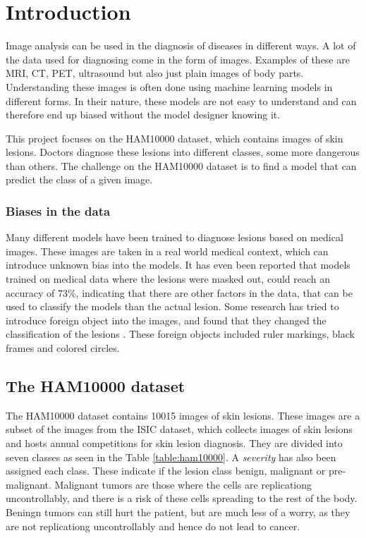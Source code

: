 \chapter{Introduction}\label{sec:introduction}
Image analysis can be used in the diagnosis of diseases in different ways.
A lot of the data used for diagnosing come in the form of images.
Examples of these are MRI, CT, PET, ultrasound but also just plain images of body parts.
Understanding these images is often done using machine learning models in different forms.
In their nature, these models are not easy to understand and can therefore end up biased without
the model designer knowing it.

This project focuses on the HAM10000 dataset\cite{Tschandl_2018}, which contains images of skin lesions.
Doctors diagnose these lesions into different classes, some more dangerous than others.
The challenge on the HAM10000 dataset is to find a model that can predict the class of a given image.

\subsection{Biases in the data}
Many different models have been trained to diagnose lesions based on medical images.
These images are taken in a real world medical context, which can introduce unknown bias into the models.
It has even been reported that models trained on medical data where the lesions were masked out,
could reach an accuracy of $73\%$\cite{DeConstructing_Bias_on_Skin_Lesion_Datasets_2019}, indicating that there are other factors in the data, 
that can be used to classify the models than the actual lesion.
Some research has tried to introduce foreign object into the images,
and found that they changed the classification of the lesions \cite{Towards_Explainable_Classifiers_Using_the_Counterfactual_Approach_2019}.
These foreign objects included ruler markings, black frames and colored circles.

\section{The HAM10000 dataset}
The HAM10000 dataset contains 10015 images of skin lesions.
These images are a subset of the images from the ISIC dataset\cite{ISIC_Dataset_2018},
which collects images of skin lesions and hosts annual competitions for skin lesion diagnosis.
They are divided into seven classes as seen in the Table \ref{table:ham10000}.
A \textit{severity} has also been assigned each class.
These indicate if the lesion class benign, malignant or pre-malignant.
Malignant tumors are those where the cells are replicationg uncontrollably,
and there is a risk of these cells spreading to the rest of the body.
Beningn tumors can still hurt the patient, but are much less of a worry,
as they are not replicationg uncontrollably and hence do not lead to cancer.

